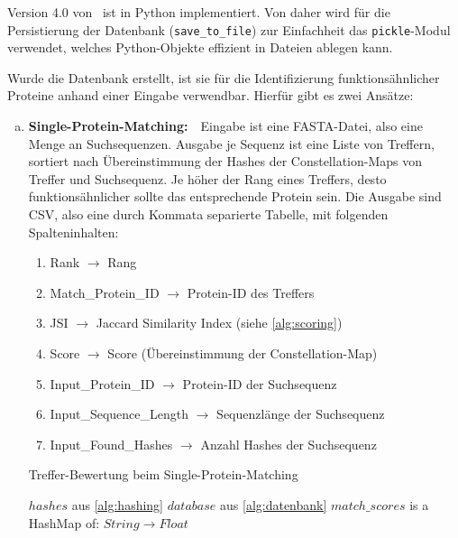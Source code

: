         Version 4.0 von \protfin\ ist in Python implementiert. Von daher wird für die Persistierung der Datenbank (\texttt{save\_to\_file}) zur Einfachheit das \texttt{pickle}-Modul verwendet, welches Python-Objekte effizient in Dateien ablegen kann.

        Wurde die Datenbank erstellt, ist sie für die Identifizierung funktionsähnlicher Proteine anhand einer Eingabe verwendbar. Hierfür gibt es zwei Ansätze:
        \begin{enumerate}[a)]
            \item {}
                \textbf{Single-Protein-Matching:}\ \ Eingabe ist eine FASTA-Datei, also eine Menge an Suchsequenzen. Ausgabe je Sequenz ist eine Liste von Treffern, sortiert nach Übereinstimmung der Hashes der Constellation-Maps von Treffer und Suchsequenz. Je höher der Rang eines Treffers, desto funktionsähnlicher sollte das entsprechende Protein sein. Die Ausgabe sind \ac{CSV}, also eine durch Kommata separierte Tabelle, mit folgenden Spalteninhalten:
                \begin{enumerate}[1.]
                    \item Rank $\rightarrow$ Rang
                    \item Match\_Protein\_ID $\rightarrow$ Protein-ID des Treffers
                    \item JSI $\rightarrow$ Jaccard Similarity Index (siehe \autoref{alg:scoring})
                    \item Score $\rightarrow$ Score (Übereinstimmung der Constellation-Map)
                    \item Input\_Protein\_ID $\rightarrow$ Protein-ID der Suchsequenz
                    \item Input\_Sequence\_Length $\rightarrow$ Sequenzlänge der Suchsequenz
                    \item Input\_Found\_Hashes $\rightarrow$ Anzahl Hashes der Suchsequenz
                \end{enumerate}

                \newcommand{\Width}{\dimexpr\textwidth-\leftmargin}
                \begin{minipage}{\Width}
                    \begin{algorithm}[H]
                        \caption{Treffer-Bewertung beim Single-Protein-Matching}\label{alg:scoring}
                        \begin{algorithmic}[1]
                            \Require $hashes$ aus \autoref{alg:hashing}
                            \Require $database$ aus \autoref{alg:datenbank}
                            \Ensure $match\_scores$ is a HashMap of: $String \rightarrow Float$


\end{algorithmic}
\end{algorithm}
\end{minipage}
\end{enumerate}
